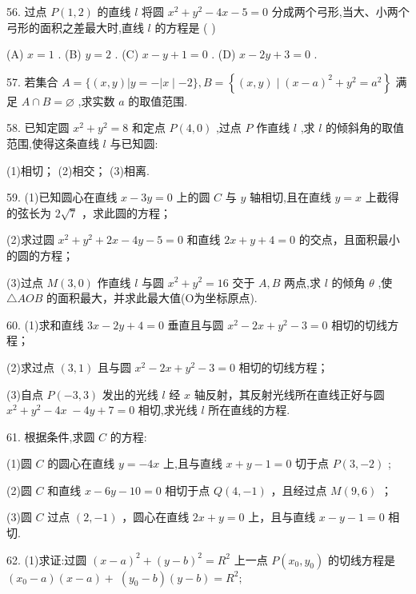 \documentclass[10pt]{article}
\begin{document}
56. 过点 \(P\left( {1,2}\right)\) 的直线 \(l\) 将圆 \({x}^{2} + {y}^{2} - {4x} - 5 = 0\) 分成两个弓形,当大、小两个弓形的面积之差最大时,直线 \(l\) 的方程是 ( )

(A) \(x = 1\) . (B) \(y = 2\) . (C) \(x - y + 1 = 0\) . (D) \(x - {2y} + 3 = 0\) .

57. 若集合 \(A = \{ \left( {x,y}\right) \left| {y =  - }\right| x \mid   - 2\} ,B = \left\{  {\left( {x,y}\right)  \mid  {\left( x - a\right) }^{2} + {y}^{2} = {a}^{2}}\right\}\) 满足 \(A \cap  B = \varnothing\) ,求实数 \(a\) 的取值范围.

58. 已知定圆 \({x}^{2} + {y}^{2} = 8\) 和定点 \(P\left( {4,0}\right)\) ,过点 \(P\) 作直线 \(l\) ,求 \(l\) 的倾斜角的取值范围,使得这条直线 \(l\) 与已知圆:

(1)相切； (2)相交； (3)相离.

59. (1)已知圆心在直线 \(x - {3y} = 0\) 上的圆 \(C\) 与 \(y\) 轴相切,且在直线 \(y = x\) 上截得的弦长为 \(2\sqrt{7}\) ，求此圆的方程；

(2)求过圆 \({x}^{2} + {y}^{2} + {2x} - {4y} - 5 = 0\) 和直线 \({2x} + y + 4 = 0\) 的交点，且面积最小的圆的方程；

(3)过点 \(M\left( {3,0}\right)\) 作直线 \(l\) 与圆 \({x}^{2} + {y}^{2} = {16}\) 交于 \(A,B\) 两点,求 \(l\) 的倾角 \(\theta\) ,使 \(\bigtriangleup {AOB}\) 的面积最大，并求此最大值(O为坐标原点).

60. (1)求和直线 \({3x} - {2y} + 4 = 0\) 垂直且与圆 \({x}^{2} - {2x} + {y}^{2} - 3 = 0\) 相切的切线方程；

(2)求过点 \(\left( {3,1}\right)\) 且与圆 \({x}^{2} - {2x} + {y}^{2} - 3 = 0\) 相切的切线方程；

(3)自点 \(P\left( {-3,3}\right)\) 发出的光线 \(l\) 经 \(x\) 轴反射，其反射光线所在直线正好与圆 \({x}^{2} + {y}^{2} - {4x} \; - {4y} + 7 = 0\) 相切,求光线 \(l\) 所在直线的方程.

61. 根据条件,求圆 \(C\) 的方程:

(1)圆 \(C\) 的圆心在直线 \(y =  - {4x}\) 上,且与直线 \(x + y - 1 = 0\) 切于点 \(P\left( {3, - 2}\right)\) ;

(2)圆 \(C\) 和直线 \(x - {6y} - {10} = 0\) 相切于点 \(Q\left( {4, - 1}\right)\) ，且经过点 \(M\left( {9,6}\right)\) ；

(3)圆 \(C\) 过点 \(\left( {2, - 1}\right)\) ，圆心在直线 \({2x} + y = 0\) 上，且与直线 \(x - y - 1 = 0\) 相切.

62. (1)求证:过圆 \({\left( x - a\right) }^{2} + {\left( y - b\right) }^{2} = {R}^{2}\) 上一点 \(P\left( {{x}_{0},{y}_{0}}\right)\) 的切线方程是 \(\left( {{x}_{0} - a}\right) \left( {x - a}\right)  + \; \left( {{y}_{0} - b}\right) \left( {y - b}\right)  = {R}^{2};\)
\end{document}
